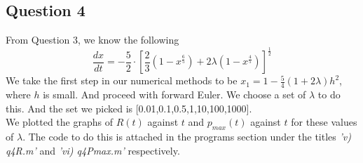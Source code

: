 \documentclass[10pt]{article}
\begin{document}
\subsection*{Question 4}
From Question 3, we know the following
\[\frac{dx}{dt}= -\frac{5}{2}\cdot [\frac{2}{3}(1-x^{\frac{6}{5}}) + 2\lambda (1-x^{\frac{4}{5}})]^{\frac{1}{2}}\]
We take the first step in our numerical methods to be $x_1 = 1-\frac{5}{4}(1+2\lambda)h^2$, where $h$ is small. And proceed with forward Euler.
We choose a set of $\lambda$ to do this. And the set we picked is [0.01,0.1,0.5,1,10,100,1000].\\
We plotted the graphs of $R(t)$ against $t$ and $p_{max}(t)$ against $t$ for these values of $\lambda$. The code to do this is attached in the programs section under the titles \emph{'v) q4\textunderscore R.m'} and \emph{'vi) q4\textunderscore Pmax.m'} respectively.\\
\end{document}
